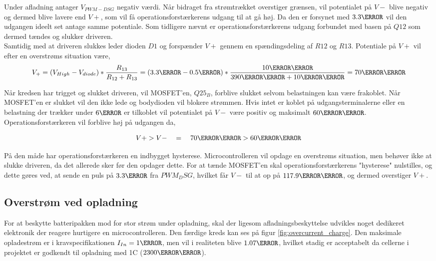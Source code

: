Under afladning antager $V_{PWM-DSG}$ negativ værdi. Når bidraget fra  strømtrækket overstiger grænsen, vil potentialet på $V-$ blive negativ og dermed blive lavere end $V+$, som vil få operationsforstærkerens udgang til at gå høj. Da den er forsynet med $3.3\volt$ vil den udgangen ideelt set antage samme potentiale. Som tidligere nævnt er operationsforstærkerens udgang forbundet med basen på $Q12$ som dermed tændes og slukker driveren.
\\
Samtidig med at driveren slukkes leder dioden $D1$ og forspænder $V+$ gennem en spændingsdeling af $R12$ og $R13$. Potentiale på $V+$ vil efter en overstrøms situation være,
\begin {equation} 
V_{+} = (V_{High} - V_{diode} ) * \frac{R_{13}}{R_{12}+R_{13}} = (3.3\volt - 0.5\volt ) * \frac{10\kilo\ohm}{390\kilo\ohm + 10\kilo\ohm} =  70\milli\volt
\end {equation}

Når kredsen har trigget og slukket driveren, vil MOSFET'en, $Q25_B$, forblive slukket selvom belastningen kan være frakoblet. Når MOSFET'en er slukket vil den ikke lede og bodydioden vil blokere strømmen.
Hvis intet er koblet på udgangsterminalerne eller en belastning der trækker under $6\ampere$ er tilkoblet vil potentialet på $V-$ være positiv og maksimalt $60\milli\volt$. Operationsforstærkeren vil forblive høj på udgangen da,

\begin {equation} 
V+ > V- \quad = \quad 70\milli\volt > 60\milli\volt
\end {equation}

På den måde har operationsforstærkeren en indbygget hysterese.
Microcontrolleren vil opdage en overstrøms situation, men behøver ikke at slukke driveren, da det allerede sker før den opdager dette. For at tænde MOSFET'en skal operationsforstærkerens "hysterese" nulstilles, og dette gøres ved, at sende en puls på $3.3\volt$ fra $PWM_DSG$, hvilket får $V-$ til at op på $117.9\milli\volt$, og dermed overstiger $V+$.


\subsection{Overstrøm ved opladning}
For at beskytte batteripakken mod for stor strøm under opladning, skal der ligesom afladningsbeskyttelse udvikles noget dedikeret elektronik der reagere hurtigere en microcontrolleren. Den færdige kreds kan ses på figur \ref{fig:overcurrent_charge}. Den maksimale opladestrøm er i kravspecifikationen $I_{In}=1\ampere$, men vil i realiteten blive $1.07\ampere$, hvilket stadig er acceptabelt da cellerne i projektet er godkendt til opladning med 1C ($2300\milli\ampere$).
\\

